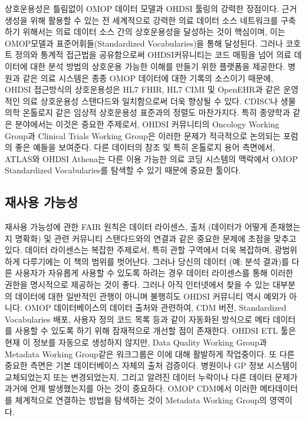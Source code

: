 \documentclass[11pt]{book}
\theoremstyle{definition}
\theoremstyle{definition}
\theoremstyle{definition}
\theoremstyle{remark}
\begin{document}
상호운용성은 틀림없이 OMOP 데이터 모델과 OHDSI 툴링의 강력한 장점이다.
근거 생성을 위해 활용할 수 있는 전 세계적으로 강력한 의료 데이터 소스
네트워크를 구축하기 위해서는 의료 데이터 소스 간의 상호운용성을 달성하는
것이 핵심이며, 이는 OMOP모델과 표준어휘들(Standardized Vocabularies)을
통해 달성된다. 그러나 코호트 정의와 통계적 접근법을 공유함으로써
OHDSI커뮤니티는 코드 매핑을 넘어 의료 데이터에 대한 분석 방법의 상호운용
가능한 이해를 만들기 위한 플랫폼을 제공한다. 병원과 같은 의료 시스템은
종종 OMOP 데이터에 대한 기록의 소스이기 때문에, OHDSI 접근방식의
상호운용성은 HL7 FHIR, HL7 CIMI 및 OpenEHR과 같은 운영적인 의료
상호운용성 스탠다드와 일치함으로써 더욱 향상될 수 있다. CDISC나 생물의학
온톨로지 같은 임상적 상호운용성 표준과의 정렬도 마찬가지다. 특히
종양학과 같은 분야에서는 이것은 중요한 주제로서, OHDSI 커뮤니티의
Oncology Working Group과 Clinical Trials Working Group은 이러한 문제가
적극적으로 논의되는 포럼의 좋은 예들을 보여준다. 다른 데이터의 참조 및
특히 온톨로지 용어 측면에서, ATLAS와 OHDSI Athena는 다른 이용 가능한
의료 코딩 시스템의 맥락에서 OMOP Standardized Vocabularies를 탐색할 수
있기 때문에 중요한 툴이다.

\subsection{재사용 가능성}\label{-}

재사용 가능성에 관한 FAIR 원칙은 데이터 라이센스, 출처 (데이터가 어떻게
존재했는지 명확화) 및 관련 커뮤니티 스탠다드와의 연결과 같은 중요한
문제에 초점을 맞추고 있다. 데이터 라이센스는 복잡한 주제로서, 특히 관할
구역에서 더욱 복잡하며, 광범위하게 다루기에는 이 책의 범위를 벗어난다.
그러나 당신의 데이터 (예: 분석 결과)를 다른 사용자가 자유롭게 사용할 수
있도록 하려는 경우 데이터 라이센스를 통해 이러한 권한을 명시적으로
제공하는 것이 좋다. 그러나 아직 인터넷에서 찾을 수 있는 대부분의
데이터에 대한 일반적인 관행이 아니며 불행히도 OHDSI 커뮤니티 역시 예외가
아니다. OMOP 데이터베이스의 데이터 출처와 관련하여, CDM 버전,
Standardized Vocabularies 배포, 사용자 정의 코드 목록 등과 같이 자동화된
방식으로 메타 데이터를 사용할 수 있도록 하기 위해 잠재적으로 개선할 점이
존재한다. OHDSI ETL 툴은 현재 이 정보를 자동으로 생성하지 않지만, Data
Quality Working Group과 Metadata Working Group같은 워크그룹은 이에 대해
활발하게 작업중이다. 또 다른 중요한 측면은 기본 데이터베이스 자체의 출처
검증이다. 병원이나 GP 정보 시스템이 교체되었는지 또는 변경되었는지,
그리고 알려진 데이터 누락이나 다른 데이터 문제가 과거에 언제
발생했는지를 아는 것이 중요하다. OMOP CDM에서 이러한 메타데이터를
체계적으로 연결하는 방법을 탐색하는 것이 Metadata Working Group의
영역이다.
\end{document}
